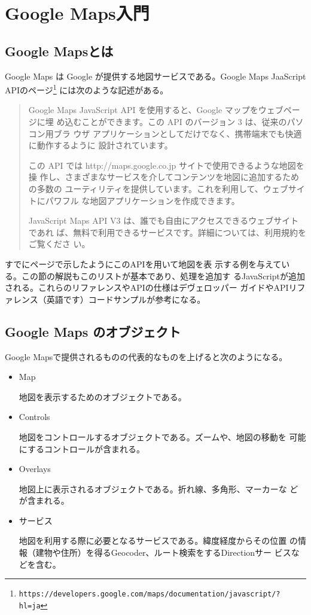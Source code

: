 \chapter{Google Maps入門}
\section{Google Mapsとは}
Google Maps は Google が提供する地図サービスである。Google Maps
JaaScript APIのページ\footnote{
\texttt{https://developers.google.com/maps/documentation/javascript/?hl=ja}}
には次のような記述がある。
\begin{quotation}
 Google Maps JavaScript API を使用すると、Google マップをウェブページに埋
 め込むことができます。この API のバージョン 3 は、従来のパソコン用ブラ
 ウザ アプリケーションとしてだけでなく、携帯端末でも快適に動作するように
 設計されています。 

この API では http://maps.google.co.jp サイトで使用できるような地図を操
 作し、さまざまなサービスを介してコンテンツを地図に追加するための多数の
 ユーティリティを提供しています。これを利用して、ウェブサイトにパワフル
 な地図アプリケーションを作成できます。 

JavaScript Maps API V3 は、誰でも自由にアクセスできるウェブサイトであれ
 ば、無料で利用できるサービスです。詳細については、利用規約をご覧くださ
 い。
\end{quotation}
すでに\pageref{ExGoogleMaps}ページで示したようにこのAPIを用いて地図を表
示する例を与えている。この節の解説もこのリストが基本であり、処理を追加す
るJavaScriptが追加される。これらのリファレンスやAPIの仕様はデヴェロッパー
ガイドやAPIリファレンス（英語です）コードサンプルが参考になる。
\section{Google Maps のオブジェクト}
Google Mapsで提供されるものの代表的なものを上げると次のようになる。
\begin{itemize}
 \item Map

       地図を表示するためのオブジェクトである。
 \item Controls

       地図をコントロールするオブジェクトである。ズームや、地図の移動を
       可能にするコントロールが含まれる。
 \item Overlays

       地図上に表示されるオブジェクトである。折れ線、多角形、マーカーな
       どが含まれる。
 \item サービス

       地図を利用する際に必要となるサービスである。緯度経度からその位置
       の情報（建物や住所）を得るGeocoder、ルート検索をするDirectionサー
       ビスなどを含む。
\end{itemize}
